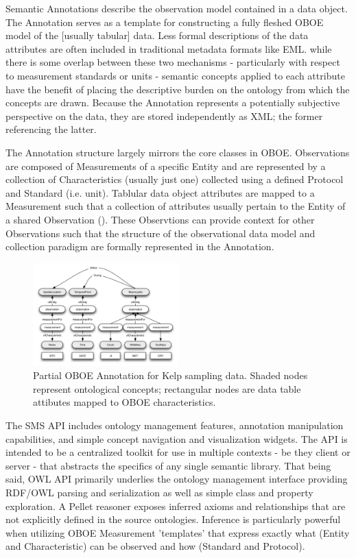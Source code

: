  Semantic Annotations describe the
observation model contained in a data object. The Annotation serves as
a template for constructing a fully fleshed OBOE model of the [usually
tabular] data. Less formal descriptions of the data attributes are
often included in traditional metadata formats like EML. while there
is some overlap between these two mechanisms - particularly with
respect to measurement standards or units - semantic concepts applied
to each attribute have the benefit of placing the descriptive burden
on the ontology from which the concepts are drawn. Because the
Annotation represents a potentially subjective perspective on the
data, they are stored independently as XML; the former referencing the
latter.

The Annotation structure largely mirrors the core classes in
OBOE. Observations are composed of Measurements of a specific Entity
and are represented by a collection of Characteristics (usually just
one) collected using a defined Protocol and Standard (i.e. unit).
Tablular data object attributes are mapped to a Measurement such that
a collection of attributes usually pertain to the Entity of a shared
Observation (). These Observtions can
provide context for other Observations such that the structure of the
observational data model and collection paradigm are formally
represented in the Annotation.


\begin{figure}
\centering
\includegraphics[width=0.5\textwidth]{images/kelp-mass-model.png}
\caption{Partial OBOE Annotation for Kelp sampling data. Shaded nodes represent ontological concepts; rectangular nodes are data table attibutes mapped to OBOE characteristics.}
\label{fig:kelp-mass-model}
\end{figure}


 The SMS API includes ontology
management features, annotation manipulation capabilities, and simple
concept navigation and visualization widgets. The API is intended to
be a centralized toolkit for use in multiple contexts - be they client
or server - that abstracts the specifics of any single semantic
library. That being said, OWL API primarily underlies the ontology
management interface providing RDF/OWL parsing and serialization as
well as simple class and property exploration. A Pellet reasoner
exposes inferred axioms and relationships that are not explicitly
defined in the source ontologies. Inference is particularly powerful
when utilizing OBOE Measurement 'templates' that express exactly what
(Entity and Characteristic) can be observed and how (Standard and
Protocol).

